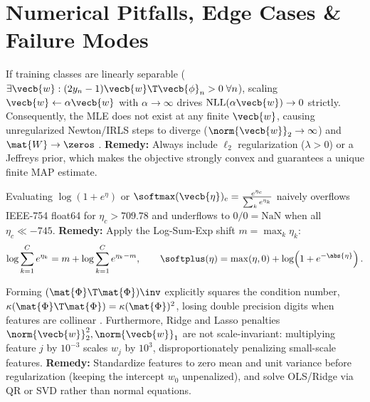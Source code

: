 \documentclass[../../../../master.tex]{subfiles}
\begin{document}
\section{Numerical Pitfalls, Edge Cases \& Failure Modes}
\label{sec:glm:pitfalls}

\begin{pitfall}
If training classes are linearly separable ($\exists \vecb{w}: (2y_n - 1)\vecb{w}\T\vecb{\phi}_n > 0\;\forall n$), scaling $\vecb{w} \leftarrow \alpha\vecb{w}$ with $\alpha \to \infty$ drives $\mathrm{NLL}(\alpha\vecb{w}) \to 0$ strictly. Consequently, the MLE does not exist at any finite $\vecb{w}$, causing unregularized Newton/IRLS steps to diverge ($\norm{\vecb{w}}_2 \to \infty$) and $\mat{W} \to \zeros$ . \textbf{Remedy:} Always include $\ell_2$ regularization ($\lambda > 0$) or a Jeffreys prior, which makes the objective strongly convex and guarantees a unique finite MAP estimate.
\end{pitfall}

\begin{pitfall}
Evaluating $\log(1 + e^\eta)$ or $\softmax(\vecb{\eta})_c = \frac{e^{\eta_c}}{\sum_k e^{\eta_k}}$ naively overflows IEEE-754 float64 for $\eta_c > 709.78$ and underflows to $0/0 = \mathrm{NaN}$ when all $\eta_c \ll -745$. \textbf{Remedy:} Apply the Log-Sum-Exp shift $m = \max_k \eta_k$:
\begin{equation}
\label{eq:glm:lse_stable}
\log\sum_{k=1}^C e^{\eta_k} = m + \log\sum_{k=1}^C e^{\eta_k - m}, \qquad
\softplus(\eta) = \max(\eta, 0) + \log\!\left(1 + e^{-\abs{\eta}}\right).
\end{equation}
\end{pitfall}

\begin{pitfall}
Forming $(\mat{\Phi}\T\mat{\Phi})\inv$ explicitly squares the condition number, $\kappa(\mat{\Phi}\T\mat{\Phi}) = \kappa(\mat{\Phi})^2$, losing double precision digits when features are collinear . Furthermore, Ridge and Lasso penalties $\norm{\vecb{w}}_2^2, \norm{\vecb{w}}_1$ are not scale-invariant: multiplying feature $j$ by $10^{-3}$ scales $w_j$ by $10^3$, disproportionately penalizing small-scale features. \textbf{Remedy:} Standardize features to zero mean and unit variance before regularization (keeping the intercept $w_0$ unpenalized), and solve OLS/Ridge via QR or SVD rather than normal equations.
\end{pitfall}
\end{document}
